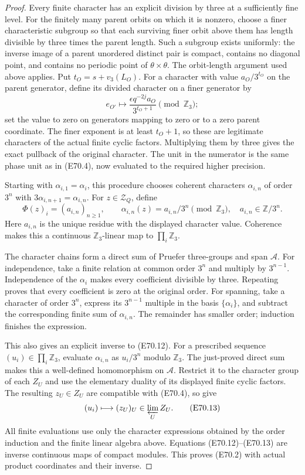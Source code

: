 \begin{proof}
Every finite character has an explicit division
by three at a sufficiently fine level.
For the finitely many parent orbits on which it
is nonzero, choose a finer characteristic
subgroup so that each surviving finer orbit
above them has length divisible by three times
the parent length. Such a subgroup exists
uniformly: the inverse image of a parent
unordered distinct pair is compact, contains
no diagonal point, and contains no periodic
point of $\theta\times\theta$.
The orbit-length argument used above applies.
Put $t_O=s+v_3(L_O)$.
For a character with value $a_O/3^{t_O}$ on
the parent generator, define its divided
character on a finer generator by
\[
       e_{O'}\longmapsto
          \frac{\epsilon q^{-2j}a_O}{3^{t_O+1}}
                  \pmod{\mathbb Z_3};
 \tag{E70.11}
\]
set the value to zero on generators mapping
to zero or to a zero parent coordinate.
The finer exponent is at least $t_O+1$, so
these are legitimate characters of the actual
finite cyclic factors. Multiplying them by
three gives the exact pullback of the original
character. The unit in the numerator is the
same phase unit as in (E70.4), now evaluated
to the required higher precision.

Starting with $\alpha_{i,1}=\alpha_i$, this
procedure chooses coherent characters
$\alpha_{i,n}$ of order $3^n$ with
$3\alpha_{i,n+1}=\alpha_{i,n}$.
For $z\in\mathcal Z_Q$, define
\[
 \Phi(z)_i=(a_{i,n})_{n\ge1},\qquad
 \alpha_{i,n}(z)=a_{i,n}/3^n\pmod{\mathbb Z_3},
 \quad a_{i,n}\in\mathbb Z/3^n.
 \tag{E70.12}
\]
Here $a_{i,n}$ is the unique residue with
the displayed character value.
Coherence makes this a continuous
$\mathbb Z_3$-linear map to
$\prod_i\mathbb Z_3$.

The character chains form a direct sum of
Pruefer three-groups and span $\mathcal A$.
For independence, take a finite relation at
common order $3^n$ and multiply by $3^{n-1}$.
Independence of the $\alpha_i$ makes every
coefficient divisible by three. Repeating
proves that every coefficient is zero at
the original order.
For spanning, take a character of order
$3^n$, express its $3^{n-1}$ multiple in
the basis $\{\alpha_i\}$, and subtract the
corresponding finite sum of $\alpha_{i,n}$.
The remainder has smaller order; induction
finishes the expression.

This also gives an explicit inverse to
(E70.12). For a prescribed sequence
$(u_i)\in\prod_i\mathbb Z_3$, evaluate
$\alpha_{i,n}$ as $u_i/3^n$ modulo
$\mathbb Z_3$. The just-proved direct sum
makes this a well-defined homomorphism on
$\mathcal A$. Restrict it to the character
group of each $Z_U$ and use the elementary
duality of its displayed finite cyclic
factors. The resulting $z_U\in Z_U$ are
compatible with (E70.4), so give
\[
              (u_i)\longmapsto
                   (z_U)_U\in\varprojlim_U Z_U.
 \tag{E70.13}
\]
All finite evaluations use only the character
expressions obtained by the order induction
and the finite linear algebra above.
Equations (E70.12)--(E70.13) are inverse
continuous maps of compact modules.
This proves (E70.2) with actual product
coordinates and their inverse.


\end{proof}
